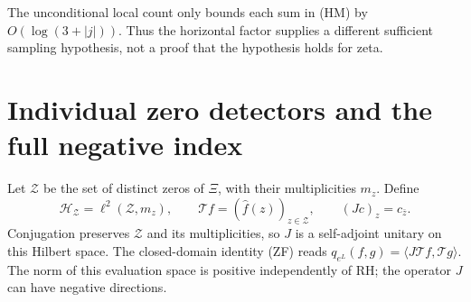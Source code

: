 \documentclass[11pt]{article}
\theoremstyle{remark}\newtheorem{remark}[theorem]{Remark}
\begin{document}
The unconditional local count only bounds each sum in
(HM) by $O(\log(3+|j|))$. Thus the horizontal factor
supplies a different sufficient sampling hypothesis,
not a proof that the hypothesis holds for zeta.

\section{Individual zero detectors and the full negative index}
Let $\mathcal Z$ be the set of distinct zeros of $\Xi$, with
their multiplicities $m_z$. Define
\[
 \mathcal H_{\mathcal Z}=\ell^2(\mathcal Z,m_z),\qquad
 \mathcal T f=(\widehat f(z))_{z\in\mathcal Z},\qquad
 (Jc)_z=c_{\bar z}.
\]
Conjugation preserves $\mathcal Z$ and its multiplicities, so
$J$ is a self-adjoint unitary on this Hilbert space.
The closed-domain identity (ZF) reads
$q_{e^L}(f,g)=\langle J\mathcal T f,\mathcal T g\rangle$.
The norm of this evaluation space is positive independently of
RH; the operator $J$ can have negative directions.
\end{document}
